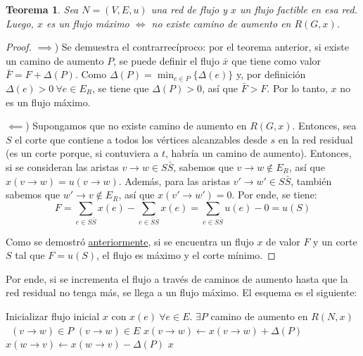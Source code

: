 \documentclass[a4paper]{report}
\newcommand{\Each}{\kw{each}\ }
\newtheorem*{theorem*}{Teorema}
\begin{document}
\begin{theorem*}
    Sea $N = (V, E, u)$ una red de flujo y $x$ un flujo factible en esa red. Luego, $x$ es un flujo máximo $\iff$ no existe camino de aumento en $R(G, x)$.
\end{theorem*}
\begin{proof}
    \leavevmode

    $\implies$) Se demuestra el contrarrecíproco: por el teorema anterior, si existe un camino de aumento $P$, se puede definir el flujo $\bar{x}$ que tiene como valor $\bar{F} = F + \Delta(P)$. Como $\Delta(P) = \min_{e \in P}{\{\Delta(e)\}}$ y, por definición $\Delta(e) > 0\ \forall e \in E_R$, se tiene que $\Delta(P) > 0$, así que $\bar{F} > F$. Por lo tanto, $x$ no es un flujo máximo.

    $\impliedby$) Supongamos que no existe camino de aumento en $R(G, x)$. Entonces, sea $S$ el corte que contiene a todos los vértices alcanzables desde $s$ en la red residual (es un corte porque, si contuviera a $t$, habría un camino de aumento). Entonces, si se consideran las aristas $v \rightarrow w \in S\bar{S}$, sabemos que $v \rightarrow w \notin E_R$, así que $x(v \rightarrow w) = u(v \rightarrow w)$. Además, para las aristas $v' \rightarrow w' \in S\bar{S}$, también sabemos que $w' \rightarrow v \notin E_R$, así que $x(v' \rightarrow w') = 0$. Por ende, se tiene:
    $$F = \sum_{e \in S\bar{S}} x(e) - \sum_{e \in \bar{S}S} x(e) = \sum_{e \in S\bar{S}} u(e) - 0 = u(S)$$

    Como se demostró \hyperref[flujo-certificado-optimalidad]{anteriormente}, si se encuentra un flujo $x$ de valor $F$ y un corte $S$ tal que $F = u(S)$, el flujo es máximo y el corte mínimo.

\end{proof}

Por ende, si se incrementa el flujo a través de caminos de aumento hasta que la red residual no tenga más, se llega a un flujo máximo. El esquema es el siguiente:

\begin{codebox}
        \li Inicializar flujo inicial $x$ con $x(e)\ \forall e \in E$.
        \li \While $\exists P$ camino de aumento en $R(N, x)$ \Do
        \li \For \Each $(v \rightarrow w) \in P$ \Do
        \li \If $(v \rightarrow w) \in E$ \Then
        \li $x(v \rightarrow w) \gets x(v \rightarrow w) + \Delta(P)$
        \li \Else
        \li $x(w \rightarrow v) \gets x(w \rightarrow v) - \Delta(P)$
        \End
        \End
        \End
        \li \Return $x$
\end{codebox}
\end{document}
